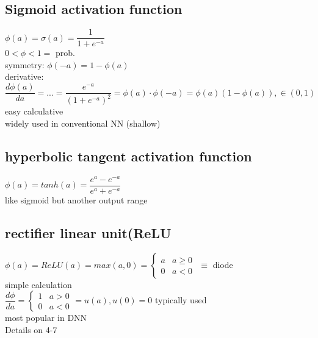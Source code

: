 \subsection{Sigmoid activation function}
$ \phi (a) = \sigma (a) = \dfrac{1}{1 + e^{-a}} $ 
 \\
\textbullet $  0 < \phi < 1 \overset {\hat{}}{=}  $ prob.\\
\textbullet symmetry: $ \phi(-a) = 1-\phi(a)  $ \\
\textbullet derivative: $ \dfrac{d \phi(a) }{da} = ... = \dfrac{e^{-a}}{(1+ e^{-a})^2}  = \phi (a) \cdot \phi (-a ) = \phi (a) (1- \phi (a) ), \in (0,1) $\\
easy calculative \\
\textbullet widely used in conventional NN (shallow) \\
\subsection{hyperbolic tangent activation function }
$ \phi (a) = tanh(a) = \dfrac{e^{a} -e^{-a}  }{e^{a}  + e^{-a} }    $ \\
like sigmoid but another output range 
\subsection{rectifier linear unit(ReLU}
$  \phi (a ) = ReLU(a) = max (a,0) =  \left\lbrace \begin{array}{lc}
a & a \geq 0 \\
0 & a < 0 
\end{array} \right.$ 
\textbullet $ \equiv $ diode \\
simple calculation \\
\textbullet $  \dfrac{d \phi}{da} = \left\lbrace \begin{array}{lc}
1 & a > 0 \\
0 & a <0 
\end{array} \right.  = u(a), u(0) = 0$ typically used \\
\textbullet most popular in DNN \\
\textbullet Details on 4-7
